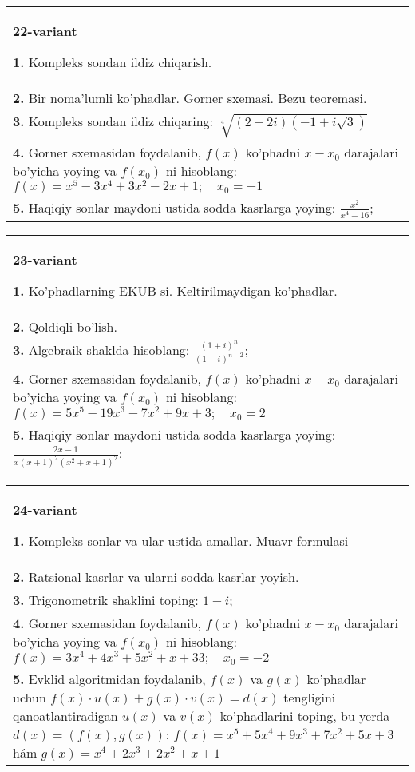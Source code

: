 \documentclass{article}
\begin{document}
\begin{tabular}{m{17cm}}
\textbf{22-variant}
\newline

\textbf{1.} Kompleks sondan ildiz chiqarish. \\
\textbf{2.} Bir noma’lumli ko’phadlar. Gorner sxemasi. Bezu teoremasi.  \\
\textbf{3.} Kompleks sondan ildiz chiqaring: $\sqrt[4]{(2+2 i)(-1+i \sqrt{3})}$ \\
\textbf{4.} Gorner sxemasidan foydalanib, $f(x)$ ko’phadni $x-x_0$ darajalari bo’yicha yoying va $f\left(x_0\right)$ ni hisoblang: $f(x)=x^5-3 x^4+3 x^2-2 x+1 ; \quad x_0=-1$ \\
\textbf{5.} Haqiqiy sonlar maydoni ustida sodda kasrlarga yoying:  $\frac{x^2}{x^4-16}$; \\

\end{tabular}
\vspace{1cm}


\begin{tabular}{m{17cm}}
\textbf{23-variant}
\newline

\textbf{1.} Ko’phadlarning EKUB si. Keltirilmaydigan ko’phadlar. \\
\textbf{2.} Qoldiqli bo’lish.  \\
\textbf{3.} Algebraik shaklda hisoblang: $\frac{(1+i)^n}{(1-i)^{n-2}}$; \\
\textbf{4.} Gorner sxemasidan foydalanib, $f(x)$ ko’phadni $x-x_0$ darajalari bo’yicha yoying va $f\left(x_0\right)$ ni hisoblang: $f(x)=5 x^5-19 x^3-7 x^2+9 x+3 ; \quad x_0=2$ \\
\textbf{5.} Haqiqiy sonlar maydoni ustida sodda kasrlarga yoying:  $\frac{2 x-1}{x(x+1)^2\left(x^2+x+1\right)^2}$; \\

\end{tabular}
\vspace{1cm}


\begin{tabular}{m{17cm}}
\textbf{24-variant}
\newline

\textbf{1.} Kompleks sonlar va ular ustida amallar. Muavr formulasi  \\
\textbf{2.} Ratsional kasrlar va ularni sodda kasrlar yoyish. \\
\textbf{3.} Trigonometrik shaklini toping: $1-i$; \\
\textbf{4.} Gorner sxemasidan foydalanib, $f(x)$ ko’phadni $x-x_0$ darajalari bo’yicha yoying va $f\left(x_0\right)$ ni hisoblang: $f(x)=3 x^4+4 x^3+5 x^2+x+33 ; \quad x_0=-2$ \\
\textbf{5.} Evklid algoritmidan foydalanib, $f(x)$ va $g(x)$ ko’phadlar uchun $f(x) \cdot u(x)+g(x) \cdot v(x)=d(x)$ tengligini qanoatlantiradigan $u(x)$ va $v(x)$ ko’phadlarini toping, bu yerda $d(x)=(f(x), g(x))$:  $f(x)=x^5+5 x^4+9 x^3+7 x^2+5 x+3$ hám $g(x)=x^4+2 x^3+2 x^2+x+1$ \\

\end{tabular}
\vspace{1cm}
\end{document}
